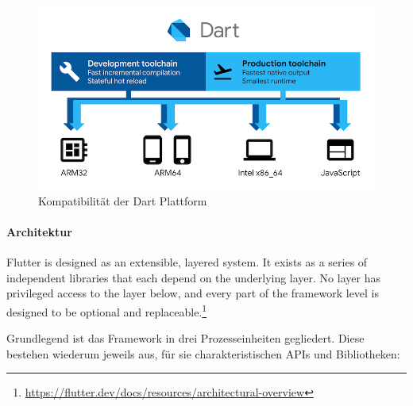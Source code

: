 \begin{figure}[h]
	\begin{center}
		\includegraphics[scale=0.45]{images/dart-diagram.png}
	\end{center}
	\caption{Kompatibilität der Dart Plattform \protect \footnotemark}
	\label{fig:dart_plattform}
\end{figure}

\paragraph{Architektur}
\begin{displayquote}
	Flutter is designed as an extensible, layered system. It exists as a series of independent libraries that each depend on the underlying layer. No layer has privileged access to the layer below, and every part of the framework level is designed to be optional and replaceable.\footnote{\url{https://flutter.dev/docs/resources/architectural-overview}}
\end{displayquote}

Grundlegend ist das Framework in drei Prozesseinheiten gegliedert. Diese bestehen wiederum jeweils aus, für sie charakteristischen APIs und Bibliotheken:

